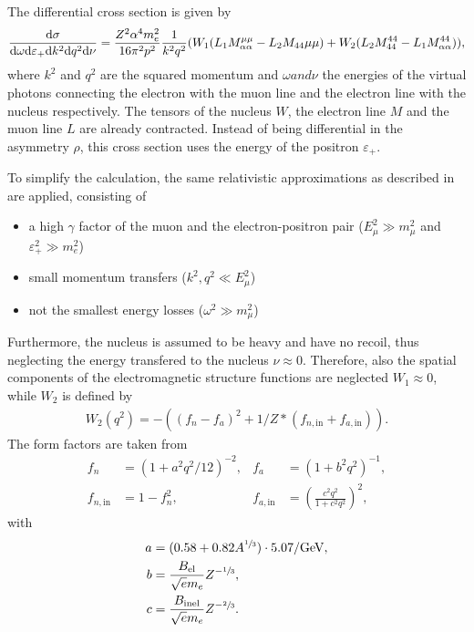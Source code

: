 The differential cross section is given by
\begin{align}
    \frac{\mathrm{d} \sigma}{\mathrm{d} \omega \mathrm{d} \varepsilon_+ \mathrm{d} k^2 \mathrm{d} q^2 \mathrm{d} \nu} =
        \frac{Z^2 \alpha^4 m_e^2}{16 \pi^2 p^2} \frac{1}{k^2 q^2}
        (W_1(L_1 M_{\alpha \alpha}^{\mu \mu} - L_2 M_{44}{\mu \mu})
        + W_2 (L_2 M_{44}^{44} - L_1 M_{\alpha \alpha}^{44})) ,
\end{align}
where $k^2$ and $q^2$ are the squared momentum and $\omega and \nu$ the energies of the virtual photons connecting the electron with the muon line and the electron line with the nucleus respectively.
The tensors of the nucleus $W$, the electron line $M$ and the muon line $L$ are already contracted.
Instead of being differential in the asymmetry $\rho$, this cross section uses the energy of the positron $\varepsilon_+$.

To simplify the calculation, the same relativistic approximations as described in \cite{Bugaev77} are applied, consisting of
\begin{itemize}
    \item a high $\gamma$ factor of the muon and the electron-positron pair ($E_\mu^2 \gg m_\mu^2$ and $\varepsilon_+^2 \gg m_e^2$)
    \item small momentum transfers ($k^2, q^2 \ll E_\mu^2$)
    \item not the smallest energy losses ($\omega^2 \gg m_\mu^2$)
\end{itemize}
Furthermore, the nucleus is assumed to be heavy and have no recoil, thus neglecting the energy transfered to the nucleus $\nu \approx 0$.
Therefore, also the spatial components of the electromagnetic structure functions are neglected $W_1 \approx 0$, while $W_2$ is defined by
\begin{align}
    W_2 (q^2) = -((f_n - f_a)^2 + 1/Z*(f_{n,\mathrm{in}} + f_{a,\mathrm{in}})) .
\end{align}
The form factors are taken from \cite{Tsai74, Tsai77, Andreev94Brems}
\begin{subequations}
\begin{align}
    f_n   &= (1 + a^2 q^2/12)^{-2}, %
    & f_a &= (1 + b^2 q^2)^{-1}, \\
    f_{n,\mathrm{in}}   &= 1 - f_n^2,
    & f_{a,\mathrm{in}} &= \left(\frac{c^2 q^2}{1 + c^2 q^2} \right)^2 ,
\end{align}
\end{subequations}
with
\begin{subequations}
\begin{align}
    a &= (0.58 + 0.82 A^{\sfrac13}) \cdot 5.07/\si{GeV},
    \\
    b &= \frac{B_{\mathrm{el}}}{\sqrt{e} m_e} Z^{-\sfrac13},
    \\
    c &= \frac{B_{\mathrm{inel}}}{\sqrt{e} m_e} Z^{-\sfrac23}.
\end{align}
\end{subequations}

